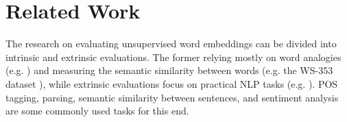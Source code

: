 \section{Related Work}
  
The research on evaluating unsupervised word embeddings can be divided into intrinsic and extrinsic evaluations. The former relying mostly on word analogies (e.g. \cite{mikolovetal2013}) and measuring the semantic similarity between words (e.g. the WS-353 dataset \cite{finkelstein2001}), while extrinsic evaluations focus on practical NLP tasks  (e.g. \cite{2016nayak-veceval}). POS tagging, parsing, semantic similarity between sentences, and sentiment analysis are some commonly used tasks for this end.





